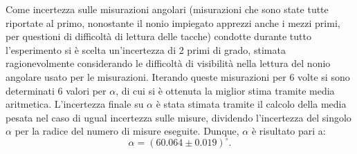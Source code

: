 \documentclass[a4paper,12pt]{article}
\begin{document}
Come incertezza sulle misurazioni angolari (misurazioni che sono state tutte riportate al primo, nonostante il nonio impiegato apprezzi anche i mezzi primi, per questioni di difficoltà di lettura delle tacche) condotte durante tutto l’esperimento si è scelta un’incertezza di 2 primi di grado, stimata ragionevolmente considerando le difficoltà di visibilità nella lettura del nonio angolare usato per le misurazioni. 
Iterando queste misurazioni per 6 volte si sono determinati 6 valori per \( \alpha \), di cui si è ottenuta la miglior stima tramite media aritmetica. L’incertezza finale su \( \alpha \) è stata stimata tramite il calcolo della media pesata nel caso di ugual incertezza sulle misure, dividendo l'incertezza del singolo \(\alpha\) per la radice del numero di misure eseguite.
Dunque, \( \alpha \) è risultato pari a:
\[\alpha = (60.064 \pm 0.019)^\circ.\] 
\end{document}
